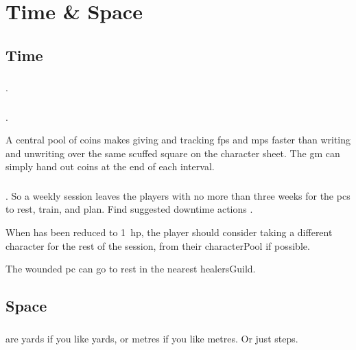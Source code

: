 \pagebreak[0]
\section{Time \& Space}

\begin{multicols}{2}

\subsection{Time}
\label{time}

\subsubsection{}
.


\subsubsection{}
.

A central pool of coins makes giving and tracking \glspl{fp} and \glspl{mp} faster than writing and unwriting over the same scuffed square on the character sheet.
The \gls{gm} can simply hand out coins at the end of each \gls{interval}.

\subsubsection{}
.
So a weekly session leaves the players with no more than three weeks for the \glspl{pc} to rest, train, and plan.
Find suggested \gls{downtime} actions .

\label{healing}
When  has been reduced to 1~\gls{hp}, the player should consider taking a different character for the rest of the session, from their \gls{characterPool} if possible.

The wounded \gls{pc} can go to rest in the nearest \gls{healersGuild}.

\subsection{Space}
\label{space}

\subsubsection{}
are yards if you like yards, or metres if you like metres.
Or just \glspl{step}.


\end{multicols}

